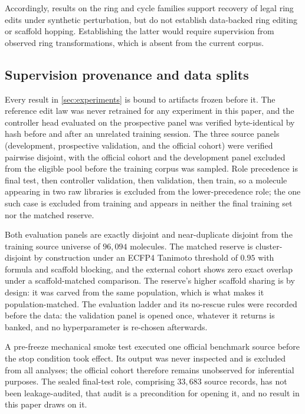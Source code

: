 Accordingly, results on the ring and cycle families support recovery of legal ring edits under synthetic perturbation, but do not establish data-backed ring editing or scaffold hopping. Establishing the latter would require supervision from observed ring transformations, which is absent from the current corpus.

\subsection{Supervision provenance and data splits}

Every result in \cref{sec:experiments} is bound to artifacts frozen before it. The reference edit law was never retrained for any experiment in this paper, and the controller head evaluated on the prospective panel was verified byte-identical by hash before and after an unrelated training session. The three source panels (development, prospective validation, and the official cohort) were verified pairwise disjoint, with the official cohort and the development panel excluded from the eligible pool before the training corpus was sampled. Role precedence is final test, then controller validation, then validation, then train, so a molecule appearing in two raw libraries is excluded from the lower-precedence role; the one such case is excluded from training and appears in neither the final training set nor the matched reserve.

Both evaluation panels are exactly disjoint and near-duplicate disjoint from the training source universe of $96{,}094$ molecules. The matched reserve is cluster-disjoint by construction under an ECFP4 Tanimoto threshold of $0.95$ with formula and scaffold blocking, and the external cohort shows zero exact overlap under a scaffold-matched comparison. The reserve's higher scaffold sharing is by design: it was carved from the same population, which is what makes it population-matched. The evaluation ladder and its no-rescue rules were recorded before the data: the validation panel is opened once, whatever it returns is banked, and no hyperparameter is re-chosen afterwards.

A pre-freeze mechanical smoke test executed one official benchmark source before the stop condition took effect. Its output was never inspected and is excluded from all analyses; the official cohort therefore remains unobserved for inferential purposes. The sealed final-test role, comprising $33{,}683$ source records, has not been leakage-audited, that audit is a precondition for opening it, and no result in this paper draws on it.

